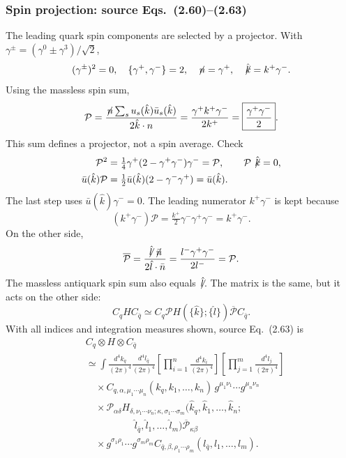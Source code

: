 \documentclass[14pt,a4paper]{extarticle}
\numberwithin{equation}{section}
\newcommand{\slsh}[1]{\not\!#1}
\begin{document}
\subsubsection{Spin projection: source Eqs.~(2.60)--(2.63)}
The leading quark spin components are selected by a projector. With
$\gamma^\pm=(\gamma^0\pm\gamma^3)/\sqrt2$,
\begin{equation}
 (\gamma^\pm)^2=0,\quad\{\gamma^+,\gamma^-\}=2,\quad
 \slsh n=\gamma^+,\quad\slsh{\hat k}=k^+\gamma^-.
\end{equation}
Using the massless spin sum,
\begin{equation}
 \mathcal P
 =\frac{\slsh n\sum_su_s(\hat k)\bar u_s(\hat k)}{2\hat k\cdot n}
 =\frac{\gamma^+k^+\gamma^-}{2k^+}
 =\boxed{\frac{\gamma^+\gamma^-}{2}}.
\end{equation}
This sum defines a projector, not a spin average. Check
\begin{align}
 \mathcal P^2&=\tfrac14\gamma^+(2-\gamma^+\gamma^-)\gamma^-
 =\mathcal P,\qquad \mathcal P\slsh{\hat k}=0,\\
 \bar u(\hat k)\mathcal P
 &=\tfrac12\bar u(\hat k)(2-\gamma^-\gamma^+)=\bar u(\hat k).
\end{align}
The last step uses $\bar u(\hat k)\gamma^-=0$.
The leading numerator $k^+\gamma^-$ is kept because
\begin{equation}
 (k^+\gamma^-)\mathcal P
 =\tfrac{k^+}{2}\gamma^-\gamma^+\gamma^-=k^+\gamma^-.
\end{equation}
On the other side,
\begin{equation}
 \overline{\mathcal P}
 =\frac{\slsh{\hat l}\slsh{\bar n}}{2\hat l\cdot\bar n}
 =\frac{l^-\gamma^+\gamma^-}{2l^-}=\mathcal P.
\end{equation}
The massless antiquark spin sum also equals $\slsh{\hat l}$.
The matrix is the same, but it acts on the other side:
\begin{equation}
 C_qHC_{\bar q}\simeq
 C_q\mathcal P H(\{\hat k\};\{\hat l\})
 \overline{\mathcal P}C_{\bar q}.
\end{equation}
With all indices and integration measures shown, source Eq.~(2.63) is
\begin{equation}
\begin{aligned}
 &C_q\otimes H\otimes C_{\bar q}\\
 &\simeq\int
 \frac{d^4k_q}{(2\pi)^4}\frac{d^4l_{\bar q}}{(2\pi)^4}
 \left[\prod_{i=1}^{n}\frac{d^4k_i}{(2\pi)^4}\right]
 \left[\prod_{j=1}^{m}\frac{d^4l_j}{(2\pi)^4}\right]\\
 &\quad\times C_{q,\alpha,\mu_1\cdots\mu_n}
 (k_q,k_1,\ldots,k_n)\,
 g^{\mu_1\nu_1}\cdots g^{\mu_n\nu_n}\\
 &\quad\times\mathcal P_{\alpha\delta}
 H_{\delta,\nu_1\cdots\nu_n;\kappa,\sigma_1\cdots\sigma_m}
 \bigl(\hat k_q,\hat k_1,\ldots,\hat k_n;\\
 &\hspace{5em}\hat l_{\bar q},\hat l_1,\ldots,\hat l_m\bigr)
 \overline{\mathcal P}_{\kappa\beta}\\
 &\quad\times g^{\sigma_1\rho_1}\cdots g^{\sigma_m\rho_m}
 C_{\bar q,\beta,\rho_1\cdots\rho_m}
 (l_{\bar q},l_1,\ldots,l_m).
\end{aligned}
\label{eq:notes-full-projected-hard}
\end{equation}
\end{document}
